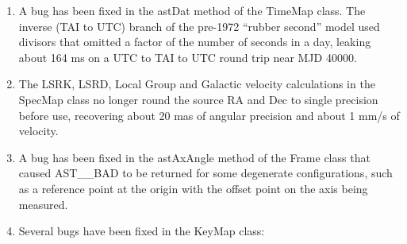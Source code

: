 \documentclass[twoside,11pt]{starlink}
\begin{document}
\begin{enumerate}
  A shift that had been merged past a MatrixMap could carry a rounding residue of the order of 1E-16, and since a ShiftMap only writes a non-zero shift to a Channel, the same Mapping was saved with a different number of items depending on whether the compiler used a fused multiply-add instruction.
\item A bug has been fixed in the astDat method of the TimeMap class.
  The inverse (TAI to UTC) branch of the pre-1972 ``rubber second'' model used divisors that omitted a factor of the number of seconds in a day, leaking about 164 ms on a UTC to TAI to UTC round trip near MJD 40000.
\item The LSRK, LSRD, Local Group and Galactic velocity calculations in the SpecMap class no longer round the source RA and Dec to single precision before use, recovering about 20 mas of angular precision and about 1 mm/s of velocity.
\item A bug has been fixed in the astAxAngle method of the Frame class that caused AST\_\_BAD to be returned for some degenerate configurations, such as a reference point at the origin with the offset point on the axis being measured.
\item Several bugs have been fixed in the KeyMap class:


\end{enumerate}
\end{document}
